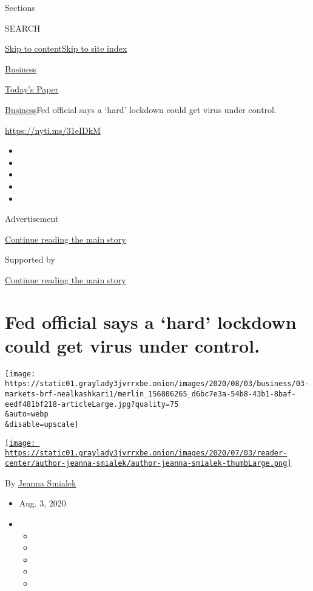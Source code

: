Sections

SEARCH

\protect\hyperlink{site-content}{Skip to
content}\protect\hyperlink{site-index}{Skip to site index}

\href{https://www.nytimes3xbfgragh.onion/section/business}{Business}

\href{https://myaccount.nytimes3xbfgragh.onion/auth/login?response_type=cookie\&client_id=vi}{}

\href{https://www.nytimes3xbfgragh.onion/section/todayspaper}{Today's
Paper}

\href{/section/business}{Business}\textbar{}Fed official says a `hard'
lockdown could get virus under control.

\url{https://nyti.ms/31eIDkM}

\begin{itemize}
\item
\item
\item
\item
\item
\end{itemize}

Advertisement

\protect\hyperlink{after-top}{Continue reading the main story}

Supported by

\protect\hyperlink{after-sponsor}{Continue reading the main story}

\hypertarget{fed-official-says-a-hard-lockdown-could-get-virus-under-control}{%
\section{Fed official says a `hard' lockdown could get virus under
control.}\label{fed-official-says-a-hard-lockdown-could-get-virus-under-control}}

\texttt{[image: https://static01.graylady3jvrrxbe.onion/images/2020/08/03/business/03-markets-brf-nealkashkari1/merlin\_156806265\_d6bc7e3a-54b8-43b1-8baf-eedf481bf218-articleLarge.jpg?quality=75\\\&auto=webp\\\&disable=upscale]}

\href{https://www.nytimes3xbfgragh.onion/by/jeanna-smialek}{\texttt{[image: https://static01.graylady3jvrrxbe.onion/images/2020/07/03/reader-center/author-jeanna-smialek/author-jeanna-smialek-thumbLarge.png]}}

By \href{https://www.nytimes3xbfgragh.onion/by/jeanna-smialek}{Jeanna
Smialek}

\begin{itemize}
\item
  Aug. 3, 2020
\item
  \begin{itemize}
  \item
  \item
  \item
  \item
  \item
  \end{itemize}
\end{itemize}

